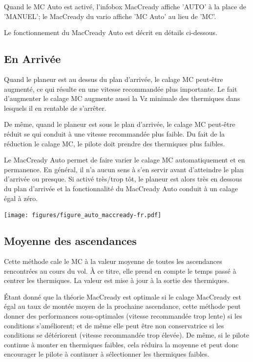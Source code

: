 Quand le MC Auto est activé, l'infobox MacCready affiche 'AUTO' à la place de 'MANUEL'; le MacCready du vario affiche 'MC Auto' au lieu de 'MC'.

Le fonctionnement du MacCready Auto est décrit en détails ci-dessous.

\subsection*{En Arrivée}
Quand le planeur est au dessus du plan d'arrivée, le calage MC peut-être augmenté, ce qui résulte en une vitesse recommandée plus importante. Le fait d'augmenter le calage MC augmente aussi la Vz minimale des thermiques dans lesquels il en rentable de s'arrêter.

De même, quand le planeur est sous le plan d'arrivée, le calage MC peut-être réduit se qui conduit à une vitesse recommandée plus faible. Du fait de la réduction le calage MC, le pilote doit prendre des thermiques plus faibles.

Le MacCready Auto permet de faire varier le calage MC automatiquement et en permanence. En général, il n'a aucun sens à s'en servir avant d'atteindre le plan d'arrivée ou presque. Si activé très/trop tôt, le planeur est alors très en dessous du plan d'arrivée et la fonctionnalité du MacCready Auto conduit à un calage égal à zéro.

\begin{maxipage}
\begin{center}
\texttt{[image: figures/figure\_auto\_maccready-fr.pdf]}
\end{center}
\end{maxipage}

\subsection*{Moyenne des ascendances}

Cette méthode cale le MC à la valeur moyenne de toutes les ascendances rencontrées au cours du vol. À ce titre, elle prend en compte le temps passé à centrer les thermiques. La valeur est mise à jour à la sortie des thermiques.

Étant donné que la théorie MacCready est optimale si le calage MacCready est égal au taux de montée moyen de la prochaine ascendance, cette méthode peut donner des performances sous-optimales (vitesse recommandée trop lente) si les conditions s'améliorent; et de même elle peut être non conservatrice si les conditions se détériorent (vitesse recommandée trop élevée).  De même, si le pilote continue à monter en thermiques faibles, cela réduira la moyenne et peut donc encourager le pilote à continuer à sélectionner les thermiques faibles.


